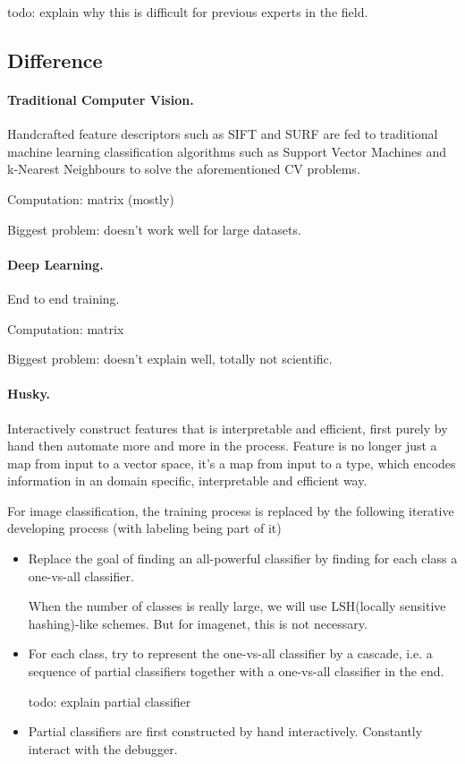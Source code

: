 \documentclass[11pt, oneside]{article}   	%
\theoremstyle{definition}
\begin{document}
\begin{rmk}
	todo: explain why this is difficult for previous experts in the field.
\end{rmk}

\subsection{Difference}

\paragraph{Traditional Computer Vision.} 
Handcrafted feature descriptors such as SIFT and SURF are fed to traditional
machine learning classification algorithms such as Support Vector Machines and k-Nearest Neighbours to solve the aforementioned CV problems.

Computation: matrix (mostly)

Biggest problem: doesn't work well for large datasets.


\paragraph{Deep Learning.}  End to end training.

Computation: matrix

Biggest problem: doesn't explain well, totally not scientific.

\paragraph{Husky.} Interactively construct features that is interpretable and efficient, first purely by hand then automate more and more in the process. Feature is no longer just a map from input to a vector space, it's a map from input to a type, which encodes information in an domain specific, interpretable and efficient way.

For image classification, the training process is replaced by the following iterative developing process (with labeling being part of it)

\begin{itemize}
	\item Replace the goal of finding an all-powerful classifier by finding for each class a one-vs-all classifier.

	\begin{rmk}
		When the number of classes is really large, we will use LSH(locally sensitive hashing)-like schemes. But for imagenet, this is not necessary.
	\end{rmk}
	\item For each class, try to represent the one-vs-all classifier by a cascade, i.e. a sequence  of partial classifiers together with a one-vs-all classifier in the end.

	todo: explain partial classifier
	\item Partial classifiers are first constructed by hand interactively. Constantly interact with the debugger.
\end{itemize}
\end{document}
